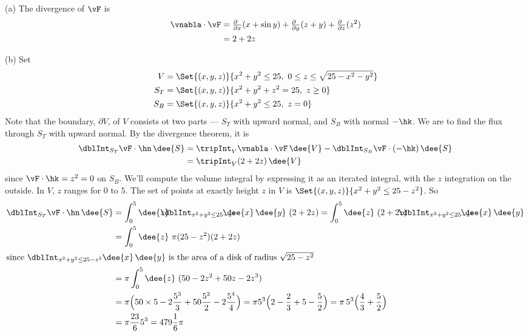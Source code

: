 \begin{solution} (a)
The divergence of $\vF$ is
\begin{align*}
\vnabla\cdot\vF 
&= \tfrac{\partial\hfill}{\partial x}(x+\sin y)
  +\tfrac{\partial\hfill}{\partial y}(z+y)
  +\tfrac{\partial\hfill}{\partial z}(z^2) \\
&=2+2z
\end{align*}

\noindent (b) Set
\begin{align*}
V &= \Set{(x,y,z)}{x^2+y^2\le 25,\ 0\le z\le \sqrt{25-x^2-y^2}} \\
S_T &= \Set{(x,y,z)}{x^2+y^2+z^2 = 25,\ z\ge 0} \\
S_B &= \Set{(x,y,z)}{x^2+y^2 \le 25,\ z= 0} 
\end{align*}
Note that the boundary, $\partial V$, of $V$ consists ot two parts ---
$S_T$ with upward normal, and $S_B$ with normal $-\hk$.
We are to find the flux through $S_T$ with upward normal. By the 
divergence theorem, it is
\begin{align*}
\dblInt_{S_T} \vF\cdot\hn\,\dee{S}
&=\tripInt_V \vnabla\cdot\vF\,\dee{V} 
     - \dblInt_{S_B} \vF\cdot(-\hk)\,\dee{S} \\
&= \tripInt_V (2+2z)\,\dee{V}  
\end{align*} 
since $\vF\cdot\hk=z^2=0$ on $S_B$. We'll compute the volume integral by expressing it as an iterated integral, with the $z$ integration on the 
outside. In $V$, $z$ ranges for $0$ to $5$. The set of points 
at exactly height $z$ in $V$ is  $\Set{(x,y,z)}{x^2+y^2\le 25-z^2}$. 
So
\begin{align*}
\dblInt_{S_T} \vF\cdot\hn\,\dee{S}
&= \int_0^5\dee{z}\hskip-10pt \dblInt_{x^2+y^2\le 25-z^2}\hskip-15pt 
            \dee{x}\,\dee{y}\  (2+2z)
= \int_0^5\dee{z}\ (2+2z)\hskip-10pt\dblInt_{x^2+y^2\le 25-z^2}\hskip-15pt 
\dee{x}\,\dee{y} \\
&= \int_0^5\dee{z}\ \pi(25-z^2) (2+2z) \\
\intertext{since $\dblInt_{x^2+y^2\le 25-z^2} \dee{x}\,\dee{y}$
is the area of a disk of radius $\sqrt{25-z^2}$}
&= \pi\int_0^5\dee{z}\ (50 -2z^2 +50z -2z^3) \\
&=\pi\Big(50\times 5-2\frac{5^3}{3} +50\frac{5^2}{2}-2\frac{5^4}{4}\Big)
=\pi 5^3 \Big(2-\frac{2}{3} +5-\frac{5}{2}\Big) 
= \pi\,5^3 \Big(\frac{4}{3}+\frac{5}{2}\Big) \\
&=\pi\frac{23}{6} 5^3
=479\frac{1}{6}\pi
\end{align*}


\end{solution}
